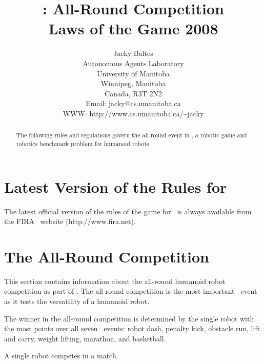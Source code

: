 \documentclass[12pt]{hurocup}
\begin{document}
\title{\HuroCup: All-Round Competition\\
  Laws of the Game 2008}


\author{Jacky Baltes\\
Autonomous Agents Laboratory\\
University of Manitoba\\
Winnipeg, Manitoba\\
Canada, R3T 2N2\\
Email: jacky@cs.umanitoba.ca\\
WWW: http://www.cs.umanitoba.ca/\~{ }jacky
}

\maketitle
\begin{abstract}
The following rules and regulations govern the all-round event in
\HuroCup, a robotic game and robotics benchmark problem for humanoid
robots.
%
\end{abstract}

\section*{Latest Version of the Rules for \HuroCup}
\label{sec:updates}

The latest official version of the rules of the game for \HuroCup\ is
always available from the FIRA \HuroCup\ website (http://www.fira.net).

\newpage

\section{The All-Round Competition}
\label{sec:all-round} 

This section contains information about the all-round humanoid robot
competition as part of \HuroCup. The all-round competition is the most
important \HuroCup\ event as it tests the versatility of a humanoid
robot. 

The winner in the all-round competition is determined by the single
robot with the most points over all seven \HuroCup\ events: robot dash,
penalty kick, obstacle run, lift and carry, weight lifting, marathon,
and basketball.


\begin{lawlist}[RD]
 \item A single robot competes in a match.
\end{lawlist}
\end{document}
